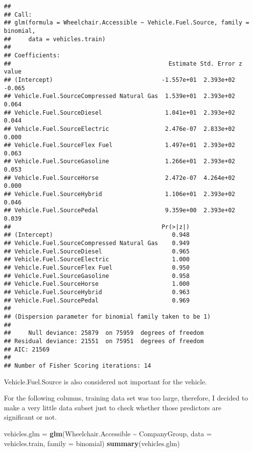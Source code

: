 \documentclass[
]{article}
\newenvironment{Shaded}{\begin{snugshade}}{\end{snugshade}}
\newcommand{\AttributeTok}[1]{\textcolor[rgb]{0.13,0.29,0.53}{#1}}
\newcommand{\FunctionTok}[1]{\textcolor[rgb]{0.13,0.29,0.53}{\textbf{#1}}}
\newcommand{\NormalTok}[1]{#1}
\newcommand{\OtherTok}[1]{\textcolor[rgb]{0.56,0.35,0.01}{#1}}
\newcommand{\SpecialCharTok}[1]{\textcolor[rgb]{0.81,0.36,0.00}{\textbf{#1}}}
\begin{document}
\begin{verbatim}
## 
## Call:
## glm(formula = Wheelchair.Accessible ~ Vehicle.Fuel.Source, family = binomial, 
##     data = vehicles.train)
## 
## Coefficients:
##                                             Estimate Std. Error z value
## (Intercept)                               -1.557e+01  2.393e+02  -0.065
## Vehicle.Fuel.SourceCompressed Natural Gas  1.539e+01  2.393e+02   0.064
## Vehicle.Fuel.SourceDiesel                  1.041e+01  2.393e+02   0.044
## Vehicle.Fuel.SourceElectric                2.476e-07  2.833e+02   0.000
## Vehicle.Fuel.SourceFlex Fuel               1.497e+01  2.393e+02   0.063
## Vehicle.Fuel.SourceGasoline                1.266e+01  2.393e+02   0.053
## Vehicle.Fuel.SourceHorse                   2.472e-07  4.264e+02   0.000
## Vehicle.Fuel.SourceHybrid                  1.106e+01  2.393e+02   0.046
## Vehicle.Fuel.SourcePedal                   9.359e+00  2.393e+02   0.039
##                                           Pr(>|z|)
## (Intercept)                                  0.948
## Vehicle.Fuel.SourceCompressed Natural Gas    0.949
## Vehicle.Fuel.SourceDiesel                    0.965
## Vehicle.Fuel.SourceElectric                  1.000
## Vehicle.Fuel.SourceFlex Fuel                 0.950
## Vehicle.Fuel.SourceGasoline                  0.958
## Vehicle.Fuel.SourceHorse                     1.000
## Vehicle.Fuel.SourceHybrid                    0.963
## Vehicle.Fuel.SourcePedal                     0.969
## 
## (Dispersion parameter for binomial family taken to be 1)
## 
##     Null deviance: 25879  on 75959  degrees of freedom
## Residual deviance: 21551  on 75951  degrees of freedom
## AIC: 21569
## 
## Number of Fisher Scoring iterations: 14
\end{verbatim}

Vehicle.Fuel.Source is also considered not important for the vehicle.

For the following columns, training data set was too large, therefore, I
decided to make a very little data subset just to check whether those
predictors are significant or not.

\begin{Shaded}
\begin{Highlighting}[]
\NormalTok{vehicles.glm }\OtherTok{=} \FunctionTok{glm}\NormalTok{(Wheelchair.Accessible }\SpecialCharTok{\textasciitilde{}}\NormalTok{ CompanyGroup, }\AttributeTok{data =}\NormalTok{ vehicles.train, }
                  \AttributeTok{family =}\NormalTok{ binomial)}
\FunctionTok{summary}\NormalTok{(vehicles.glm)}
\end{Highlighting}
\end{Shaded}
\end{document}
